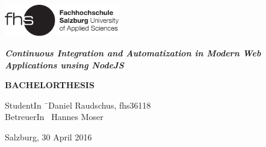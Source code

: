 \begin{titlepage}
\begin{center}

\includegraphics[width=5cm]{images/FHSLogo.pdf}

\vspace*{4cm}

\Large{
	\textit{\textbf{Continuous Integration and Automatization in Modern Web Applications unsing NodeJS}}
}

\vspace*{4cm}

\large{
	\textbf{BACHELORTHESIS}
}

\end{center}

\vfill

\begin{tabbing}
StudentIn \= \ Daniel Raudschus, fhs36118 \\
BetreuerIn \> \ Hannes Moser
\end{tabbing}

Salzburg, 30 April 2016

\end{titlepage}
